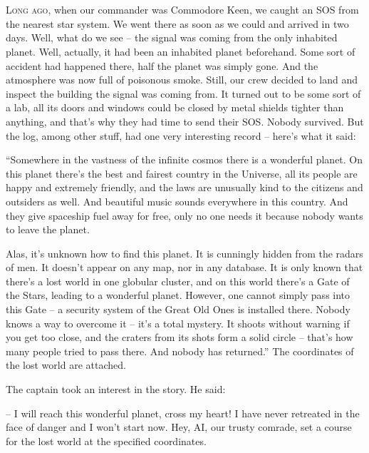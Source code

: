 \documentclass[ebook,twoside,final,openright]{memoir}
\begin{document}
\chapter{}
\par
\lettrine{L}{ong ago,} when our commander was Commodore Keen, we caught an SOS from the nearest star system. We went there as soon as we could and arrived in two days. Well, what do we see – the signal was coming from the only inhabited planet. Well, actually, it had been an inhabited planet beforehand. Some sort of accident had happened there, half the planet was simply gone. And the atmosphere was now full of poisonous smoke. Still, our crew decided to land and inspect the building the signal was coming from. It turned out to be some sort of a lab, all its doors and windows could be closed by metal shields tighter than anything, and that's why they had time to send their SOS. Nobody survived. But the log, among other stuff, had one very interesting record – here’s what it said:\par
\par
“Somewhere in the vastness of the infinite cosmos there is a wonderful planet. On this planet there’s the best and fairest country in the Universe, all its people are happy and extremely friendly, and the laws are unusually kind to the citizens and outsiders as well. And beautiful music sounds everywhere in this country. And they give spaceship fuel away for free, only no one needs it because nobody wants to leave the planet. \par
Alas, it’s unknown how to find this planet. It is cunningly hidden from the radars of men. It doesn’t appear on any map, nor in any database. It is only known that there’s a lost world in one globular cluster, and on this world there’s a Gate of the Stars, leading to a wonderful planet. However, one cannot simply pass into this Gate – a security system of the Great Old Ones is installed there. Nobody knows a way to overcome it – it’s a total mystery. It shoots without warning if you get too close, and the craters from its shots form a solid circle – that's how many people tried to pass there. And nobody has returned.” The coordinates of the lost world are attached.\par
\par
The captain took an interest in the story. He said:\par
– I will reach this wonderful planet, cross my heart! I have never retreated in the face of danger and I won’t start now. Hey, AI, our trusty comrade, set a course for the lost world at the specified coordinates.\par
\end{document}
